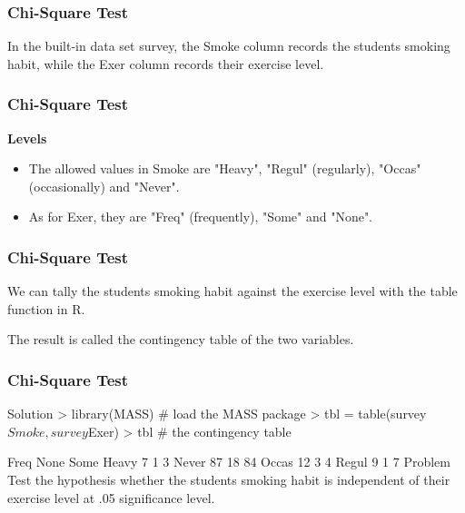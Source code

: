 \begin{frame}[fragile]
\frametitle{Chi-Square Test}
In the built-in data set survey, the Smoke column records the students smoking habit, while the 
Exer column records their exercise level. 

\end{frame}
\begin{frame}[fragile]
\frametitle{Chi-Square Test}
\textbf{Levels}
\begin{itemize}
\item The allowed values in Smoke are "Heavy", "Regul" (regularly), "Occas" (occasionally) and "Never". 
\item As for Exer, they are "Freq" (frequently), "Some" and "None".
\end{itemize}
\end{frame}
\begin{frame}[fragile]
\frametitle{Chi-Square Test}

We can tally the students smoking habit against the exercise level with the table function in R. 

The result is called the contingency table of the two variables.
\end{frame}
\begin{frame}[fragile]
\frametitle{Chi-Square Test}
Solution
> library(MASS)       # load the MASS package 
> tbl = table(survey$Smoke, survey$Exer) 
> tbl                 # the contingency table 
 
        Freq None Some 
  Heavy    7    1    3 
  Never   87   18   84 
  Occas   12    3    4 
  Regul    9    1    7
Problem
Test the hypothesis whether the students smoking habit is independent of their exercise level at .05 significance level.
\end{frame}
